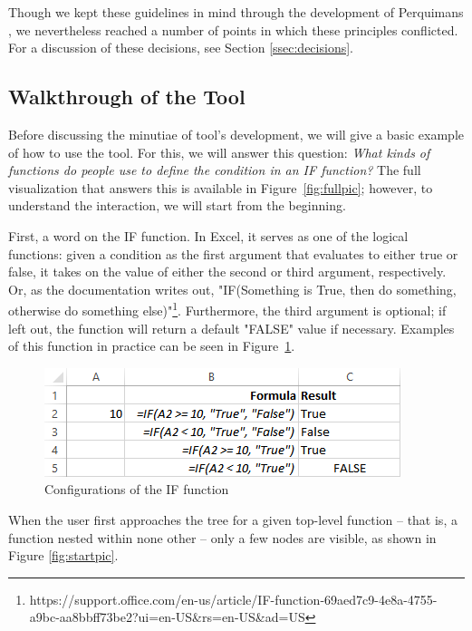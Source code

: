 \documentclass[conference]{IEEEtran}
\newcommand{\toolname}{Perquimans }
\begin{document}
	Though we kept these guidelines in mind through the development of \toolname,
	we nevertheless reached a number of points in which these principles
	conflicted. For a discussion of these decisions, see Section
	\ref{ssec:decisions}.
	
	\subsection{Walkthrough of the Tool} \label{sec:walkthrough}Before discussing
	the minutiae of tool's development, we will give a basic example of how
	to use the tool. For this, we will answer this question: \textit{ What kinds of
		functions do people use to define the condition in an IF function?} The full
	visualization that answers this is available in Figure~\ref{fig:fullpic};
	however, to understand the interaction, we will start from the beginning. \par
	
	First, a word on the IF function. In Excel, it serves as one of the logical
	functions: given a condition as the first argument that evaluates to either
	true or false, it takes on the value of either the second or third argument,
	respectively. Or, as the documentation writes out, "IF(Something is True, then
	do something, otherwise do something
	else)"\footnote{https://support.office.com/en-us/article/IF-function-69aed7c9-4e8a-4755-a9bc-aa8bbff73be2?ui=en-US\&rs=en-US\&ad=US}. 
	Furthermore, the third argument is optional; if left out, the function will return a default "FALSE" value if necessary. Examples of this function in practice can be seen in Figure~\ref{fig:ifexample}.
	
	\begin{figure}[h] \centering \includegraphics[width=.5\textwidth]{ifExample}
		\caption{Configurations of the IF function} \label{fig:ifexample} \end{figure}
	
	When the user first approaches the tree for a given top-level function -- that
	is, a function nested within none other -- only a few nodes are visible, as
	shown in Figure \ref{fig:startpic}. \par
	
\end{document}
